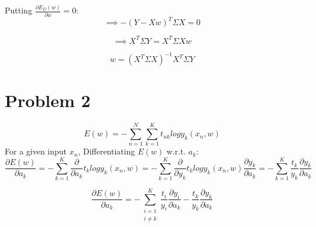 \documentclass[12pt]{article}
\begin{document}
Putting $\frac{\partial E_D(w)}{\partial w} = 0$:
\begin{equation*}
    \implies
    -(Y - Xw)^T \Sigma X = 0
\end{equation*}

\begin{equation*}
    \implies
    X^T \Sigma Y = X^T \Sigma X w
\end{equation*}

\begin{equation*}
    \boxed{w = (X^T \Sigma X)^{-1} X^T \Sigma Y}
\end{equation*}

\section*{Problem 2}
\begin{equation*}
    E(w) = - \sum_{n=1}^{N} \sum_{k=1}^{K} t_{nk} log y_{k} (x_n, w) 
\end{equation*}
For a given input $x_n$, Differentiating $E(w)$ w.r.t. $a_k$:
\begin{equation*}
    \frac{\partial E(w)}{\partial a_k} = - \sum_{k=1}^{K} \frac{\partial}{\partial a_k} t_{k} log y_{k} (x_n, w) = - \sum_{k=1}^{K} \frac{\partial}{\partial y_k} t_{k} log y_{k} (x_n, w) \frac{\partial y_k}{\partial a_k} = - \sum_{k=1}^{K} \frac{t_{k}}{y_{k}} \frac{\partial y_k}{\partial a_k}
\end{equation*}

\begin{equation*}
    \frac{\partial E(w)}{\partial a_k} = - \sum_{\substack{i=1 \\ i \neq k}}^{K} \frac{t_{i}}{y_{i}} \frac{\partial y_i}{\partial a_k} - \frac{t_{k}}{y_{k}} \frac{\partial y_k}{\partial a_k}
\end{equation*}
\end{document}
